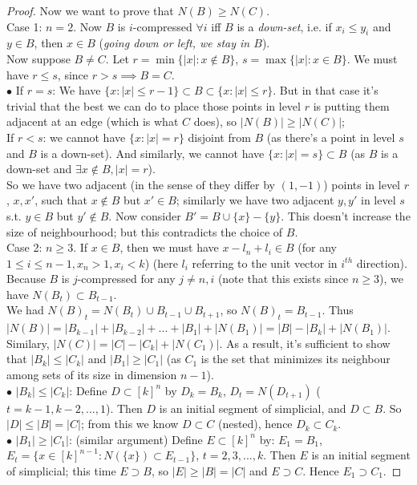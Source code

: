 \documentclass[a4paper]{article}
\begin{document}
\begin{thm}
\begin{proof}
        Now we want to prove that $N(B) \geq N(C)$.\\
        Case 1: $n=2$. Now $B$ is $i$-compressed $\forall i$ iff $B$ is a \emph{down-set}, i.e. if $x_i \leq y_i$ and $y \in B$, then $x \in B$ (\emph{going down or left, we stay in $B$}).\\
        Now suppose $B \neq C$. Let $r = \min\{|x|:x \not\in B\}$, $s = \max\{|x|: x \in B\}$. We must have $r \leq s$, since $r>s \implies B=C$.\\
        $\bullet$ If $r=s$: We have $\{x:|x| \leq r-1\} \subset B \subset \{x:|x| \leq r\}$. But in that case it's trivial that the best we can do to place those points in level $r$ is putting them adjacent at an edge (which is what $C$ does), so $|N(B)| \geq |N(C)|$;\\
        If $r<s$: we cannot have $\{x:|x| = r\}$ disjoint from $B$ (as there's a point in level $s$ and $B$ is a down-set). And similarly, we cannot have $\{x:|x| = s\} \subset B$ (as $B$ is a down-set and $\exists x \not\in B, |x|=r$).\\
        So we have two adjacent (in the sense of they differ by $(1,-1)$) points in level $r$, $x,x'$, such that $x \not\in B$ but $x' \in B$; similarly we have two adjacent $y,y'$ in level $s$ s.t. $y\in B$ but $y' \not\in B$. Now consider $B'=B \cup \{x\} - \{y\}$. This doesn't increase the size of neighbourhood; but this contradicts the choice of $B$.\\
        Case 2: $n \geq 3$. If $x \in B$, then we must have $x-l_n+l_i \in B$ (for any $1 \leq i \leq n-1, x_n >1, x_i<k$) (here $l_i$ referring to the unit vector in $i^{th}$ direction). Because $B$ is $j$-compressed for any $j \neq n,i$ (note that this exists since $n \geq 3$), we have $N(B_t) \subset B_{t-1}$.\\
        We had $N(B)_t = N(B_t) \cup B_{t-1} \cup B_{t+1}$, so $N(B)_t = B_{t-1}$. Thus $|N(B)| = |B_{k-1}| + |B_{k-2}| + ... + |B_1| + |N(B_1)| = |B|-|B_k| + |N(B_1)|$.\\
        Similary, $|N(C)| = |C| - |C_k| + |N(C_1)|$. As a result, it's sufficient to show that $|B_k| \leq |C_k|$ and $|B_1| \geq |C_1|$ (as $C_1$ is the set that minimizes its neighbour among sets of its size in dimension $n-1$).\\
        $\bullet$ $|B_k| \leq |C_k|$: Define $D \subset [k]^n$ by $D_k = B_k$, $D_t = N(D_{t+1})$ ($t=k-1,k-2,...,1$). Then $D$ is an initial segment of simplicial, and $D \subset B$. So $|D| \leq |B| = |C|$; from this we know $D \subset C$ (nested), hence $D_k \subset C_k$.\\
        $\bullet$ $|B_1| \geq |C_1|$: (similar argument) Define $E \subset [k]^n$ by: $E_1 = B_1$, $E_t = \{x \in [k]^{n-1}: N(\{x\}) \subset E_{t-1}\}$, $t=2,3,...,k$. Then $E$ is an initial segment of simplicial; this time $E \supset B$, so $|E| \geq |B| = |C|$ and $E\supset C$. Hence $E_1 \supset C_1$.
    \end{proof}
\end{thm}
\end{document}

